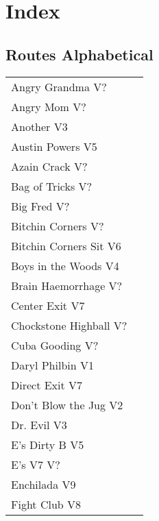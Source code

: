 \chapter{Index}
\lhead{\textcolor{\chapterColor}{\rule[-2pt]{\textwidth}{15pt}}}
\section{Routes Alphabetical}
\begin{center}
\begin{supertabular}{lr}
Angry Grandma V? & \pageref{rt:Angry Grandma} \\
Angry Mom V? & \pageref{rt:Angry Mom} \\
Another V3 & \pageref{rt:Another} \\
Austin Powers V5 & \pageref{rt:Austin Powers} \\
Azain Crack V? & \pageref{rt:Azain Crack} \\
Bag of Tricks V? & \pageref{rt:Bag of Tricks} \\
Big Fred V? & \pageref{rt:Big Fred} \\
Bitchin Corners V? & \pageref{rt:Bitchin Corners} \\
Bitchin Corners Sit V6 & \pageref{vr:Bitchin Corners Sit} \\
Boys in the Woods V4 & \pageref{rt:Boys in the Woods} \\
Brain Haemorrhage V? & \pageref{vr:Brain Haemorrhage} \\
Center Exit V7 & \pageref{vr:Center Exit} \\
Chockstone Highball V? & \pageref{rt:Chockstone Highball} \\
Cuba Gooding V? & \pageref{rt:Cuba Gooding} \\
Daryl Philbin V1 & \pageref{rt:Daryl Philbin} \\
Direct Exit V7 & \pageref{vr:Direct Exit} \\
Don't Blow the Jug V2 & \pageref{rt:Don't Blow the Jug} \\
Dr. Evil V3 & \pageref{rt:Dr. Evil} \\
E's Dirty B V5 & \pageref{rt:E's Dirty B} \\
E's V7 V? & \pageref{rt:E's V7} \\
Enchilada V9 & \pageref{rt:Enchilada} \\
Fight Club V8 & \pageref{rt:Fight Club} \\

\end{supertabular}
\end{center}

